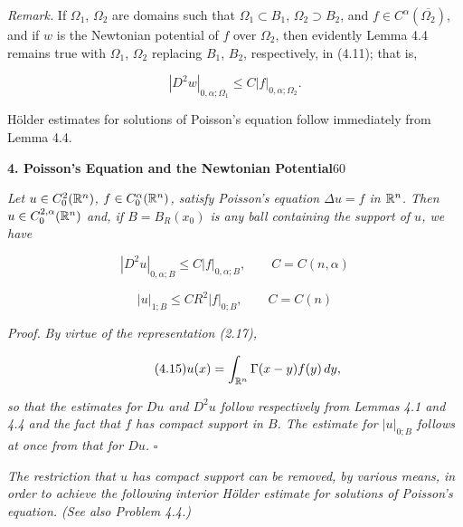 \begin{lemma}
\noindent\textit{Remark.} If $\Omega_1$, $\Omega_2$ are domains such that $\Omega_1\subset B_1$, $\Omega_2\supset B_2$, and $f\in C^\alpha(\overline{\Omega_2})$, and if $w$ is the Newtonian potential of $f$ over $\Omega_2$, then evidently Lemma 4.4 remains true with $\Omega_1$, $\Omega_2$ replacing $B_1$, $B_2$, respectively, in (4.11); that is,

\[
|D^2w|_{0,\alpha;\Omega_1}\le C|f|_{0,\alpha;\Omega_2}.
\]

\medskip

\noindent Hölder estimates for solutions of Poisson's equation follow immediately from Lemma 4.4.

\end{lemma}




\setcounter{section}{3}
\noindent\textbf{4. Poisson's Equation and the Newtonian Potential}\hfill 60

\medskip

\begin{theorem}\label{gt:thm-poisson-compact-support}
\textit{Let $u\in C_0^2(\mathbb{R}^n)$, $f\in C_0^\alpha(\mathbb{R}^n)$, satisfy Poisson's equation $\Delta u=f$ in $\mathbb{R}^n$. Then $u\in C_0^{2,\alpha}(\mathbb{R}^n)$ and, if $B=B_R(x_0)$ is any ball containing the support of $u$, we have}

\[
\tag{4.14}
\left|D^2u\right|_{0,\alpha;B}\le C\left|f\right|_{0,\alpha;B},\qquad C=C(n,\alpha)
\]

\[
\left|u\right|_{1;B}\le CR^2\left|f\right|_{0;B},\qquad C=C(n)
\]

\textit{Proof.} \textit{By virtue of the representation (2.17),}

\[
\tag{4.15}
u(x)=\int_{\mathbb{R}^n}\Gamma(x-y)f(y)\,dy,
\]

\textit{so that the estimates for $Du$ and $D^2u$ follow respectively from Lemmas 4.1 and 4.4 and the fact that $f$ has compact support in $B$. The estimate for $\left|u\right|_{0;B}$ follows at once from that for $Du$.} $\square$

\medskip

\noindent\textit{The restriction that $u$ has compact support can be removed, by various means, in order to achieve the following interior H\"older estimate for solutions of Poisson's equation. (See also Problem 4.4.)}

\end{theorem}

